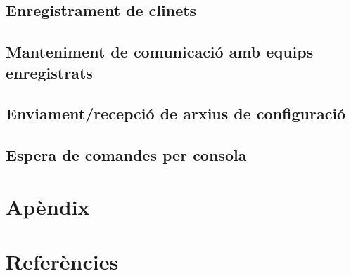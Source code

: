 \documentclass[11pt]{article}
\begin{document}
	\subsection{Enregistrament de clinets}
	\subsection{Manteniment de comunicació amb equips enregistrats }
	\subsection{Enviament/recepció de arxius de configuració}
	\subsection{Espera de comandes per consola}
\section{Apèndix}
\section{Referències}
\end{document}
